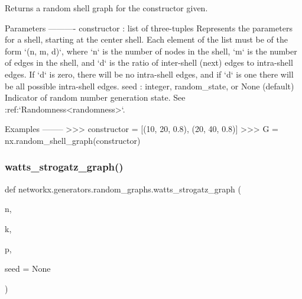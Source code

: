 \begin{DoxyVerb}Returns a random shell graph for the constructor given.

Parameters
----------
constructor : list of three-tuples
    Represents the parameters for a shell, starting at the center
    shell.  Each element of the list must be of the form `(n, m,
    d)`, where `n` is the number of nodes in the shell, `m` is
    the number of edges in the shell, and `d` is the ratio of
    inter-shell (next) edges to intra-shell edges. If `d` is zero,
    there will be no intra-shell edges, and if `d` is one there
    will be all possible intra-shell edges.
seed : integer, random_state, or None (default)
    Indicator of random number generation state.
    See :ref:`Randomness<randomness>`.

Examples
--------
>>> constructor = [(10, 20, 0.8), (20, 40, 0.8)]
>>> G = nx.random_shell_graph(constructor)\end{DoxyVerb}
 \mbox{\label{namespacenetworkx_1_1generators_1_1random__graphs_aca1f368d62c5650afc68863ab7ed28bd}} 
\subsubsection{\texorpdfstring{watts\+\_\+strogatz\+\_\+graph()}{watts\_strogatz\_graph()}}
{\footnotesize\ttfamily def networkx.\+generators.\+random\+\_\+graphs.\+watts\+\_\+strogatz\+\_\+graph (\begin{DoxyParamCaption}\item[{}]{n,  }\item[{}]{k,  }\item[{}]{p,  }\item[{}]{seed = {\ttfamily None} }\end{DoxyParamCaption})}

